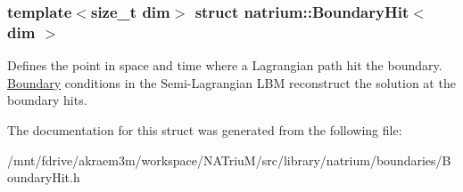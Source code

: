 \subsubsection*{template$<$size\_\-t dim$>$ struct natrium::BoundaryHit$<$ dim $>$}

Defines the point in space and time where a Lagrangian path hit the boundary. \hyperlink{classnatrium_1_1Boundary}{Boundary} conditions in the Semi-\/Lagrangian LBM reconstruct the solution at the boundary hits. 

The documentation for this struct was generated from the following file:\begin{DoxyCompactItemize}
\item 
/mnt/fdrive/akraem3m/workspace/NATriuM/src/library/natrium/boundaries/BoundaryHit.h\end{DoxyCompactItemize}
